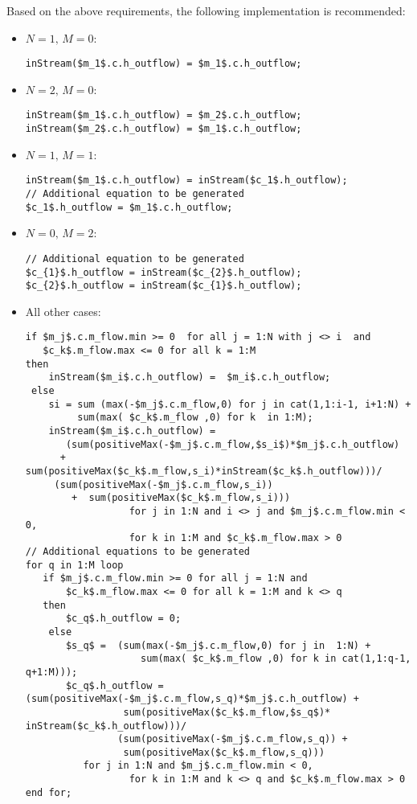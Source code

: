 \begin{nonnormative}
Based on the above requirements, the following implementation is recommended:
\begin{itemize}
\item $N = 1,\, M = 0$:\hfill
\begin{lstlisting}[language=modelica]
inStream($m_1$.c.h_outflow) = $m_1$.c.h_outflow;
\end{lstlisting}
\item $N = 2,\, M = 0$:\hfill
\begin{lstlisting}[language=modelica]
inStream($m_1$.c.h_outflow) = $m_2$.c.h_outflow;
inStream($m_2$.c.h_outflow) = $m_1$.c.h_outflow;
\end{lstlisting}
\item $N = 1,\, M = 1$:\hfill
\begin{lstlisting}[language=modelica]
inStream($m_1$.c.h_outflow) = inStream($c_1$.h_outflow);
// Additional equation to be generated
$c_1$.h_outflow = $m_1$.c.h_outflow;
\end{lstlisting}
\item $N = 0,\, M = 2$:\hfill
\begin{lstlisting}[language=modelica]
// Additional equation to be generated
$c_{1}$.h_outflow = inStream($c_{2}$.h_outflow);
$c_{2}$.h_outflow = inStream($c_{1}$.h_outflow);
\end{lstlisting}
\item All other cases:\hfill
\begin{lstlisting}[language=modelica]
if $m_j$.c.m_flow.min >= 0  for all j = 1:N with j <> i  and
   $c_k$.m_flow.max <= 0 for all k = 1:M
then
    inStream($m_i$.c.h_outflow) =  $m_i$.c.h_outflow;
 else
    si = sum (max(-$m_j$.c.m_flow,0) for j in cat(1,1:i-1, i+1:N) +
         sum(max( $c_k$.m_flow ,0) for k  in 1:M);
    inStream($m_i$.c.h_outflow) =
       (sum(positiveMax(-$m_j$.c.m_flow,$s_i$)*$m_j$.c.h_outflow)
      +  sum(positiveMax($c_k$.m_flow,s_i)*inStream($c_k$.h_outflow)))/
     (sum(positiveMax(-$m_j$.c.m_flow,s_i))
        +  sum(positiveMax($c_k$.m_flow,s_i)))
                  for j in 1:N and i <> j and $m_j$.c.m_flow.min < 0,
                  for k in 1:M and $c_k$.m_flow.max > 0
// Additional equations to be generated
for q in 1:M loop
   if $m_j$.c.m_flow.min >= 0 for all j = 1:N and
       $c_k$.m_flow.max <= 0 for all k = 1:M and k <> q
   then
       $c_q$.h_outflow = 0;
    else
       $s_q$ =  (sum(max(-$m_j$.c.m_flow,0) for j in  1:N) +
                    sum(max( $c_k$.m_flow ,0) for k in cat(1,1:q-1, q+1:M)));
       $c_q$.h_outflow = (sum(positiveMax(-$m_j$.c.m_flow,s_q)*$m_j$.c.h_outflow) +
                 sum(positiveMax($c_k$.m_flow,$s_q$)* inStream($c_k$.h_outflow)))/
                (sum(positiveMax(-$m_j$.c.m_flow,s_q)) +
                 sum(positiveMax($c_k$.m_flow,s_q)))
		  for j in 1:N and $m_j$.c.m_flow.min < 0,
                  for k in 1:M and k <> q and $c_k$.m_flow.max > 0
end for;
\end{lstlisting}
\end{itemize}


\end{nonnormative}
